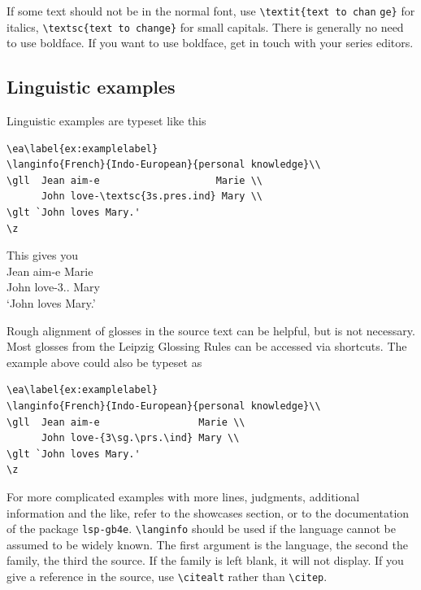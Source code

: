If some text should not be in the normal font, use 
\verb+\textit{text to chan+ \verb+ge}+ for italics, 
\verb+\textsc{text to change}+ for small capitals. There is generally no need to use boldface. If you want to use boldface, get in touch with your series editors.

\subsection{Linguistic examples}
Linguistic examples are typeset like this

\begin{verbatim}
\ea\label{ex:examplelabel}
\langinfo{French}{Indo-European}{personal knowledge}\\
\gll  Jean aim-e                    Marie \\
      John love-\textsc{3s.pres.ind} Mary \\
\glt `John loves Mary.'    
\z
\end{verbatim}

This gives you
\ea\label{ex:examplelabel}
\\
\gll  Jean aim-e Marie \\
      John love-{3\sg.\prs.\ind} Mary \\
\glt `John loves Mary.'    
\z

Rough alignment of glosses in the source text can be helpful, but is not necessary.
Most glosses from the Leipzig Glossing Rules can be accessed via shortcuts. The example above could also be typeset as

\begin{verbatim}
\ea\label{ex:examplelabel}
\langinfo{French}{Indo-European}{personal knowledge}\\
\gll  Jean aim-e                 Marie \\
      John love-{3\sg.\prs.\ind} Mary \\
\glt `John loves Mary.'    
\z
\end{verbatim}

For more complicated examples with more lines, judgments, additional information and the like, refer to the showcases section, or to the documentation of the package \verb+lsp-gb4e+.
\verb+\langinfo+ should be used if the language cannot be assumed to be widely known. The first argument is the language, the second the family, the third the source. If the family is left blank, it will not display. If you give a reference in the source, use \verb+\citealt+ rather than \verb+\citep+.

